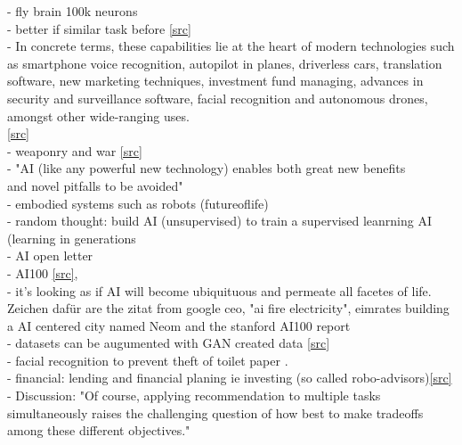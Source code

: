  - fly brain 100k neurons \cite{Zheng2018} \href{https://en.wikipedia.org/wiki/List\_of\_animals\_by\_number\_of\_neurons{[wiki]}}\\
 - better if similar task before \href{https://www.cs.ubc.ca/~amuham01/LING530/papers/radford2018improving.pdf}{[src]}\\
 - In concrete terms, these capabilities lie at the heart of modern technologies such as smartphone voice recognition, autopilot in planes, driverless cars, translation software, new marketing techniques, investment fund managing, advances in security and surveillance software, facial recognition and autonomous drones, amongst other wide-ranging uses.\\
 \href{https://onlinelibrary.wiley.com/doi/full/10.1111/1467-923X.12794}{[src]}\cite{Hassan2020}\\
 - weaponry and war \href{https://futureoflife.org/data/documents/research\_priorities.pdf}{[src]}\\
 - "AI (like any powerful new technology) enables both great new benefits\\
 and novel pitfalls to be avoided"\\
 - embodied systems such as robots (futureoflife)\\
 - random thought: build AI (unsupervised) to train a supervised leanrning AI (learning in generations\\
 - AI open letter \cite{Russel2015}\\
 - AI100 \href{https://ai100.stanford.edu/gathering-strength-gathering-storms-one-hundred-year-study-artificial-intelligence-ai100-2021-study}{[src]}, \\
 - it's looking as if AI will become ubiquituous and permeate all facetes of life. Zeichen dafür are the  zitat from google ceo, "ai fire electricity", eimrates building a AI centered city named Neom and the stanford AI100 report \cite{Littman2021}\\
 - datasets can be augumented with GAN created data [\href{https://arxiv.org/abs/1711.04340}{src}]\\
 - facial recognition to prevent theft of toilet paper \cite{Andrews2017}.\\
 - financial: lending and financial planing ie investing (so called robo-advisors)\cite{Littman2021}\href{https://ai100.stanford.edu/2021-report/standing-questions-and-responses/sq2-what-are-most-important-advances-ai}{[src]}\\
 - Discussion: "Of course, applying recommendation to multiple tasks simultaneously raises the challenging question of how best to make tradeoffs among these different objectives."\cite{Littman2021}\\
